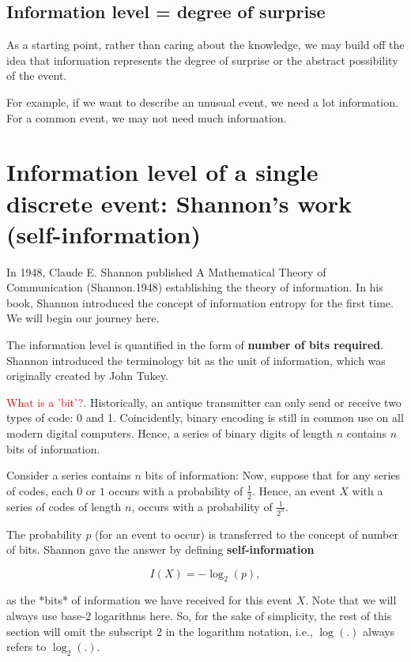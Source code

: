 \subsection{Information level = degree of surprise}

As a starting point, rather than caring about the knowledge, we may build off
the idea that information represents the degree of surprise or the abstract
possibility of the event.

For example, if we want to describe an unusual event, we need a lot information.
For a common event, we may not need much information.

\section{Information level of a single discrete event: Shannon's work (self-information)}
\label{sec:self-information}

In 1948, Claude E. Shannon published A Mathematical Theory of Communication
(Shannon.1948) establishing the theory of information. In his book, Shannon
introduced the concept of information entropy for the first time. We will begin
our journey here.

The information level is quantified in the form of {\bf number of bits required}.
Shannon introduced the terminology bit as the unit of information, which was
originally created by John Tukey. 

\textcolor{red}{What is a 'bit'?}.  Historically, an antique transmitter can
only send or receive two types of code:
0 and 1. Coincidently, binary encoding is still in common use on all modern
digital computers. Hence, a series of binary digits of length $n$ contains $n$
bits of information.

Consider a series contains $n$ bits of information: Now, suppose that for any
series of codes, each $0$ or $1$ occurs with a probability of $\frac{1}{2}$.
Hence, an event $X$ with a series of codes of length $n$, occurs with a
probability of $\frac{1}{2^n}$.

The probability $p$ (for an event to occur) is transferred to the concept of
number of bits. Shannon gave the answer by defining {\bf self-information}

$$I(X) = - \log_2 (p),$$

as the *bits* of information we have received for this event $X$.
Note that we will always use base-2 logarithms here.
So, for the sake of simplicity, the rest of this section will omit the subscript 2
in the logarithm notation, i.e., $\log(.)$ always refers to $\log_2(.)$.

